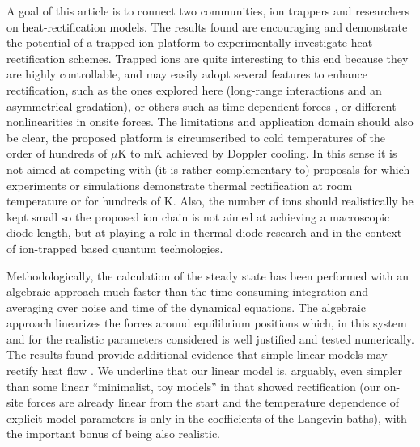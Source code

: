 A goal of this article is to connect two communities, ion trappers and
researchers on heat-rectification models. The results found are encouraging and demonstrate the potential of a trapped-ion platform to experimentally investigate heat rectification schemes. Trapped ions are quite interesting to this end because  they are highly controllable,  and may easily adopt several features to enhance rectification, such as
the ones explored here (long-range interactions and an asymmetrical gradation),
or others such as time dependent forces \cite{Li2012,Riera-Campeny2018}, or different nonlinearities in onsite forces.
The limitations and application domain should also be clear,  the proposed platform is circumscribed to cold temperatures of the order of hundreds of $\mu$K to mK achieved by Doppler cooling.
In this sense it is not aimed at competing  with (it is rather complementary to)
proposals for which experiments  \cite{Chang2006,Leitner2013,Kobayashi2009,Elzouka2017} or simulations \cite{Zhang2015,Ma2018,Reid2019}
demonstrate thermal rectification
at room temperature or for hundreds of K.
Also, the number of ions should realistically be kept small so the proposed ion chain
is not aimed at achieving a macroscopic diode length, but at playing a role in thermal diode research
and in the context of ion-trapped based quantum technologies.

Methodologically, the calculation of the steady state has been performed with an algebraic approach much faster than
the time-consuming integration and averaging over noise and time of the dynamical equations.
The algebraic approach linearizes the forces around equilibrium positions which, in this system and for the realistic parameters considered  is well justified and tested numerically.
The results found provide additional evidence that simple linear models may  rectify heat flow \cite{Pereira2017}.  We  underline that our linear
model is, arguably,  even simpler than some linear ``minimalist, toy models'' in \cite{Pereira2017} that showed rectification (our on-site forces are already linear from the start and the temperature dependence of explicit model parameters is only in the coefficients of the Langevin baths), with the important bonus of being also realistic.

